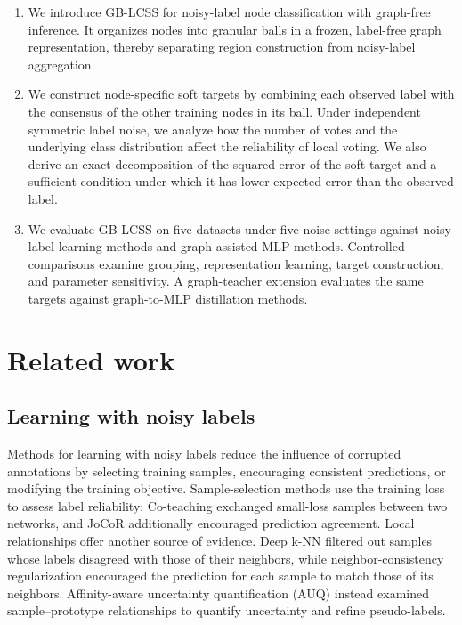 \documentclass[times,review,10pt]{elsarticle}
\theoremstyle{definition}
\theoremstyle{plain}
\begin{document}
\begin{enumerate}[label=(\arabic*)]
\item We introduce GB-LCSS for noisy-label node classification with graph-free inference. It organizes nodes into granular balls in a frozen, label-free graph representation, thereby separating region construction from noisy-label aggregation.
\item We construct node-specific soft targets by combining each observed label with the consensus of the other training nodes in its ball. Under independent symmetric label noise, we analyze how the number of votes and the underlying class distribution affect the reliability of local voting. We also derive an exact decomposition of the squared error of the soft target and a sufficient condition under which it has lower expected error than the observed label.
\item We evaluate GB-LCSS on five datasets under five noise settings against noisy-label learning methods and graph-assisted MLP methods. Controlled comparisons examine grouping, representation learning, target construction, and parameter sensitivity. A graph-teacher extension evaluates the same targets against graph-to-MLP distillation methods.
\end{enumerate}

\section{Related work}\label{sec:2}

\subsection{Learning with noisy labels}\label{sec:2.1}

Methods for learning with noisy labels reduce the influence of corrupted annotations by selecting training samples, encouraging consistent predictions, or modifying the training objective. Sample-selection methods use the training loss to assess label reliability: Co-teaching \cite{ref17} exchanged small-loss samples between two networks, and JoCoR \cite{ref18} additionally encouraged prediction agreement. Local relationships offer another source of evidence. Deep k-NN \cite{ref11} filtered out samples whose labels disagreed with those of their neighbors, while neighbor-consistency regularization \cite{ref10} encouraged the prediction for each sample to match those of its neighbors. Affinity-aware uncertainty quantification (AUQ) \cite{pr2026auq} instead examined sample--prototype relationships to quantify uncertainty and refine pseudo-labels.
\end{document}
